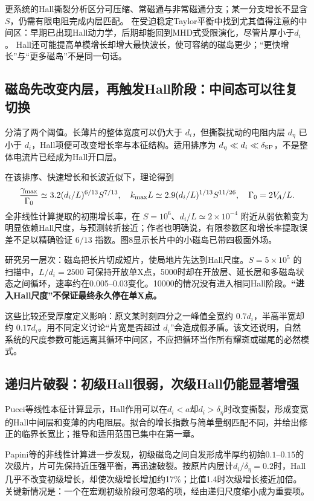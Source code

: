 更系统的Hall撕裂分析\citep{L250}区分可压缩、常磁通与非常磁通分支；某一分支增长不显含$S$，仍需有限电阻完成内层匹配。
\citet{L238}在受迫稳定Taylor平衡中找到尤其值得注意的中间区：早期已出现Hall动力学，后期却能回到MHD式受限演化，尽管片厚小于$d_i$。
Hall还可能提高单模增长却增大最快波长，使可容纳的磁岛更少；“更快增长”与“更多磁岛”不是同一句话。

\subsection{磁岛先改变内层，再触发Hall阶段：中间态可以往复切换}
\citet{Baalrud2011}分清了两个阈值。长薄片的整体宽度可以仍大于 $d_i$，但撕裂扰动的电阻内层 $d_\eta$ 已小于 $d_i$，Hall项便可改变增长率与本征结构。适用排序为 $d_\eta\ll d_i\ll\delta_{\rm SP}$，不是整体电流片已经成为Hall开口层。

在该排序、快速增长和长波近似下，理论得到
\begin{equation}
{\gamma_{\max}\over\Gamma_0}\simeq3.2(d_i/L)^{6/13}S^{7/13},\quad
k_{\max}L\simeq2.9(d_i/L)^{1/13}S^{11/26},\quad\Gamma_0=2V_{\!A}/L.
\end{equation}
全非线性计算提取的初期增长率，在 $S=10^6$、$d_i/L\simeq2\times10^{-4}$ 附近从弱依赖变为明显依赖Hall尺度，与预测转折接近；作者也明确说，有限参数区和增长率提取误差不足以精确验证 $6/13$ 指数。图8显示长片中的小磁岛已带四极面外场。

\citet{Huang2011}研究另一层次：磁岛把长片切成短片，使局地片先达到Hall尺度。$S=5\times10^5$ 的扫描中，$L/d_i=2500$ 可保持开放单X点，5000时却在开放层、延长层和多磁岛状态之间循环，速率约在0.005--0.03变化。10000的情况没有进入相同Hall阶段。\textbf{“进入Hall尺度”不保证最终永久停在单X点。}

这些比较还受厚度定义影响：原文某时刻四分之一峰值全宽约 $0.7d_i$，半高半宽却约 $0.17d_i$。用不同定义讨论“片宽是否超过 $d_i$”会造成假矛盾。该文还说明，自然系统的尺度参数可能远离其循环中间区，不应把循环当作所有耀斑或磁尾的必然模式。

\subsection{递归片破裂：初级Hall很弱，次级Hall仍能显著增强}
Pucci等线性本征计算显示，Hall作用可以在$d_i<a$却$d_i>\delta_\eta$时改变撕裂，形成变宽的Hall中间层和变薄的内电阻层。拟合的增长指数与简单量纲匹配不同，并给出修正的临界长宽比；推导和适用范围已集中在第一章。\citep{L236}

Papini等的非线性计算进一步发现，初级磁岛之间自发形成半厚约初始$0.1$--$0.15$的次级片，片可先保持近压强平衡，再迅速破裂。按原片内层计$d_i/\delta_\eta=0.2$时，Hall几乎不改变初级增长，却使次级增长增加约17\%；比值1.4时次级增长接近加倍。关键新情况是：一个在宏观初级阶段可忽略的项，经由递归尺度缩小成为重要项。\citep{L262}

